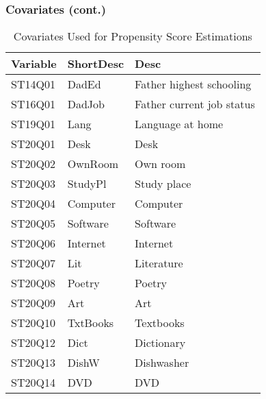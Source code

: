 \documentclass[10pt,slidestop,mathserif]{beamer}
\begin{document}
\begin{frame}
	\frametitle{Covariates (cont.)}
\begin{table}[ht]
\begin{center}
\begin{tabular}{lll}
  \hline
Variable & ShortDesc & Desc \\ 
  \hline
ST14Q01 & DadEd & Father highest schooling \\ 
  ST16Q01 & DadJob & Father current job status \\ 
  ST19Q01 & Lang & Language at home \\ 
  ST20Q01 & Desk & Desk \\ 
  ST20Q02 & OwnRoom & Own room \\ 
  ST20Q03 & StudyPl & Study place \\ 
  ST20Q04 & Computer & Computer \\ 
  ST20Q05 & Software & Software \\ 
  ST20Q06 & Internet & Internet \\ 
  ST20Q07 & Lit & Literature \\ 
  ST20Q08 & Poetry & Poetry \\ 
  ST20Q09 & Art & Art \\ 
  ST20Q10 & TxtBooks & Textbooks \\ 
  ST20Q12 & Dict & Dictionary \\ 
  ST20Q13 & DishW & Dishwasher \\ 
  ST20Q14 & DVD & DVD \\ 
   \hline
\end{tabular}
\caption{Covariates Used for Propensity Score Estimations}
\end{center}
\end{table}
\end{frame}
\end{document}
